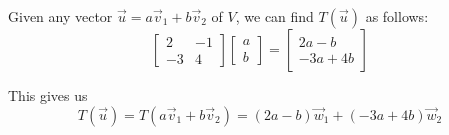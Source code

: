 \documentclass{ximera}
\begin{document}
\begin{exploration}
Given any vector $\vec{u}=a\vec{v}_1+b\vec{v}_2$ of $V$, we can find $T(\vec{u})$ as follows:
$$\begin{bmatrix}2&-1\\-3&4\end{bmatrix}\begin{bmatrix}a\\b\end{bmatrix}=\begin{bmatrix}2a-b\\-3a+4b\end{bmatrix}$$

This gives us
$$T(\vec{u})=T(a\vec{v}_1+b\vec{v}_2)=(2a-b)\vec{w}_1+(-3a+4b)\vec{w}_2$$

\end{exploration}

\end{document}
